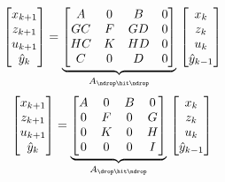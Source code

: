 \begin{equation}
    \begin{bmatrix}
        x_{k+1} \\
        z_{k+1} \\
        u_{k+1} \\
        \hat y_{k} \\
    \end{bmatrix} = \underbrace{\begin{bmatrix}
        A  & 0 & B & 0 \\
        GC & F & GD & 0 \\
        HC & K & HD & 0 \\
        C & 0 & D & 0 \\
    \end{bmatrix}}_{A_{\ndrop\hit\ndrop}}\, \begin{bmatrix}
        x_{k} \\
        z_{k} \\
        u_{k} \\
        \hat y_{k-1} \\
    \end{bmatrix}
\end{equation}
%
\begin{equation}
    \begin{bmatrix}
        x_{k+1} \\
        z_{k+1} \\
        u_{k+1} \\
        \hat y_{k} \\
    \end{bmatrix} = \underbrace{\begin{bmatrix}
        A & 0 & B & 0 \\
        0 & F & 0 & G \\
        0 & K & 0 & H \\
        0 & 0 & 0 & I
    \end{bmatrix}}_{A_{\drop\hit\ndrop}}\, \begin{bmatrix}
        x_{k} \\
        z_{k} \\
        u_{k} \\
        \hat y_{k-1} \\
    \end{bmatrix}
\end{equation}
%
